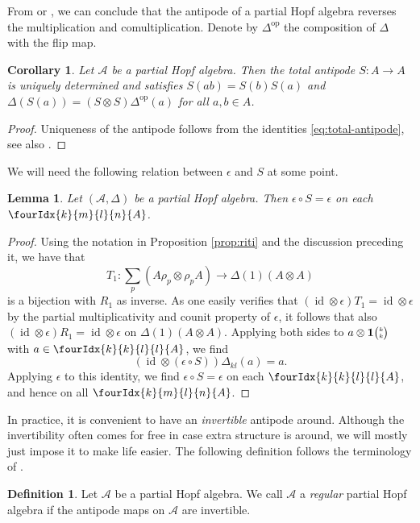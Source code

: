 \documentclass[10pt]{article}
\DeclareMathOperator{\id}{id}
\DeclareMathOperator{\op}{\mathrm{op}}
\newcommand{\Grt}[3]{#1{\tiny {\begin{pmatrix} #2\\#3\end{pmatrix}}}}
\newcommand{\UnitC}[2]{\Grt{\mathbf{1}}{#1}{#2}}
\newcommand{\Gr}[5]{\fourIdx{#2}{#4}{#3}{#5}{#1}}%
\newtheorem{Lem}[Theorem]{Lemma}
\newtheorem{Cor}[Theorem]{Corollary}
\theoremstyle{definition}
\newtheorem{Def}[Theorem]{Definition}
\numberwithin{equation}{section}
\begin{document}
From \cite[Proposition 3.5 and Proposition 3.7]{VDW1} or \cite[Theorem
6.12 and Corollary 6.16]{Boh1}, we can conclude that the antipode of a
partial Hopf algebra reverses the multiplication and
comultiplication. Denote by $\Delta^{\op}$ the composition of
$\Delta$ with the flip map.

\begin{Cor} \label{corollary:antipode} Let $\mathscr{A}$ be a partial
  Hopf algebra. Then the total antipode $S:A\rightarrow A$ is uniquely determined and satisfies
  $S(ab) = S(b)S(a)$ and $\Delta(S(a)) = (S\otimes S)\Delta^{\op}(a)$
  for all $a,b\in A$.
\end{Cor} 
\begin{proof} Uniqueness of the antipode follows from the identities \eqref{eq:total-antipode}, see also \cite[Remark 2.8.(ii)]{VDW1}. 
\end{proof} 

We will need the following relation between $\epsilon$ and $S$ at some point.

\begin{Lem}\label{LemCoAnt} Let $(\mathscr{A},\Delta)$ be a partial Hopf algebra. Then $\epsilon\circ S = \epsilon$ on each $\Gr{A}{k}{l}{m}{n}$.
\end{Lem}

\begin{proof} Using the notation in Proposition \ref{prop:riti} and the discussion preceding it, we have that \[T_1: \sum_p(A\rho_p\otimes \rho_p A)\rightarrow \Delta(1)(A\otimes A)\] is a bijection with $R_1$ as inverse. As one easily verifies that $(\id\otimes \epsilon)T_1 = \id\otimes \epsilon$ by the partial multiplicativity and counit property of $\epsilon$, it follows that also $(\id\otimes \epsilon)R_1 = \id\otimes \epsilon$ on $\Delta(1)(A\otimes A)$. Applying both sides to $a\otimes \UnitC{k}{k}$ with $a\in \Gr{A}{k}{l}{k}{l}$, we find \[(\id\otimes (\epsilon\circ S))\Delta_{kl}(a) = a.\] Applying $\epsilon$ to this identity, we find $\epsilon\circ S = \epsilon$ on each $\Gr{A}{k}{l}{k}{l}$, and hence on all $\Gr{A}{k}{l}{m}{n}$.
\end{proof} 


In practice, it is convenient to have an \emph{invertible} antipode around. Although the invertibility often comes for free in case extra structure is around, we will mostly just impose it to make life easier. The following definition follows the terminology of \cite{VDae1}. 

\begin{Def} Let $\mathscr{A}$ be a partial Hopf algebra. We call $\mathscr{A}$ a \emph{regular} partial Hopf algebra if the antipode maps on $\mathscr{A}$ are invertible.
\end{Def}
\end{document}
